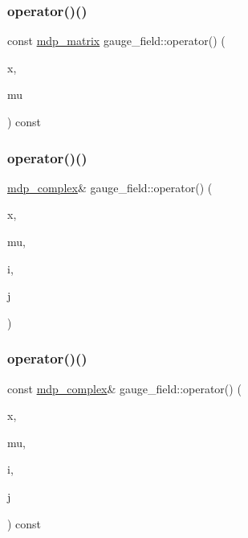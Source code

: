 \subsubsection{\texorpdfstring{operator()()}{operator()()}\hspace{0.1cm}{\footnotesize\ttfamily [2/7]}}
{\footnotesize\ttfamily const \hyperlink{classmdp__matrix}{mdp\+\_\+matrix} gauge\+\_\+field\+::operator() (\begin{DoxyParamCaption}\item[{\hyperlink{mdp__compatibility__macros_8h_aa6f1179c424e48adef1cedf7c436eb75}{site}}]{x,  }\item[{int}]{mu }\end{DoxyParamCaption}) const\hspace{0.3cm}{\ttfamily [inline]}}

\mbox{\label{classgauge__field_a60a42ee4e59ad13f7bab46ba6f4ef2d9}} 
\subsubsection{\texorpdfstring{operator()()}{operator()()}\hspace{0.1cm}{\footnotesize\ttfamily [3/7]}}
{\footnotesize\ttfamily \hyperlink{classmdp__complex}{mdp\+\_\+complex}\& gauge\+\_\+field\+::operator() (\begin{DoxyParamCaption}\item[{\hyperlink{mdp__compatibility__macros_8h_aa6f1179c424e48adef1cedf7c436eb75}{site}}]{x,  }\item[{int}]{mu,  }\item[{int}]{i,  }\item[{int}]{j }\end{DoxyParamCaption})\hspace{0.3cm}{\ttfamily [inline]}}

\mbox{\label{classgauge__field_a2bc7f601e96e278991f31089bc7a2935}} 
\subsubsection{\texorpdfstring{operator()()}{operator()()}\hspace{0.1cm}{\footnotesize\ttfamily [4/7]}}
{\footnotesize\ttfamily const \hyperlink{classmdp__complex}{mdp\+\_\+complex}\& gauge\+\_\+field\+::operator() (\begin{DoxyParamCaption}\item[{\hyperlink{mdp__compatibility__macros_8h_aa6f1179c424e48adef1cedf7c436eb75}{site}}]{x,  }\item[{int}]{mu,  }\item[{int}]{i,  }\item[{int}]{j }\end{DoxyParamCaption}) const\hspace{0.3cm}{\ttfamily [inline]}}

